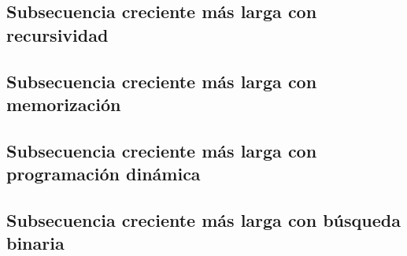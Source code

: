 \subsection{Subsecuencia creciente más larga con recursividad}

\subsection{Subsecuencia creciente más larga con memorización}

\subsection{Subsecuencia creciente más larga con programación dinámica}

\subsection{Subsecuencia creciente más larga con búsqueda binaria}
